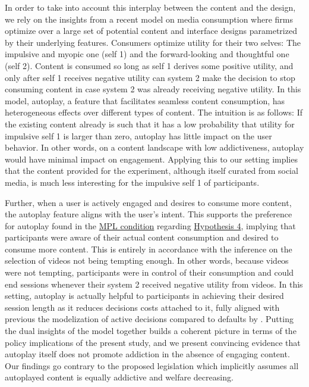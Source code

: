 \documentclass[11pt,a4paper,oneside]{article}
\begin{document}
In order to take into account this interplay between the content and the design, we rely on the insights from a recent model on media consumption \citep{kleinberg2022challenge} where firms optimize over a large set of potential content and interface designs parametrized by their underlying features. Consumers optimize utility for their two selves: The impulsive and myopic one (self 1) and the forward-looking and thoughtful one (self 2). Content is consumed so long as self 1 derives some positive utility, and only after self 1 receives negative utility can system 2 make the decision to stop consuming content in case system 2 was already receiving negative utility. In this model, autoplay, a feature that facilitates seamless content consumption, has heterogeneous effects over different types of content. The intuition is as follows: If the existing content already is such that it has a low probability that utility for impulsive self 1 is larger than zero, autoplay has little impact on the user behavior. In other words, on a content landscape with low addictiveness, autoplay would have minimal impact on engagement. Applying this to our setting implies that the content provided for the experiment, although itself curated from social media, is much less interesting for the impulsive self 1 of participants.

Further, when a user is actively engaged and desires to consume more content, the autoplay feature   aligns with the user's intent. This supports the preference for autoplay found in the \hyperref[mpl]{MPL condition} regarding \hyperref[hypotheses]{Hypothesis 4}, implying that participants were aware of their actual content consumption and desired to consume more content. This is entirely in accordance with the inference on the selection of videos not being tempting enough. In other words, because videos were not tempting, participants were in control of their consumption and could end sessions whenever their system 2 received negative utility from videos. In this setting, autoplay is actually helpful to participants in achieving their desired session length as it reduces decisions costs attached to it, fully aligned with previous the modelization of active decisions compared to defaults by \citet{carroll2009optimal}. Putting the dual insights of the model together builds a coherent picture in terms of the policy implications of the present study, and we present convincing evidence that autoplay itself does not promote addiction in the absence of engaging content. Our findings go contrary to the proposed legislation which implicitly assumes all autoplayed content is equally addictive and welfare decreasing. 
\end{document}

